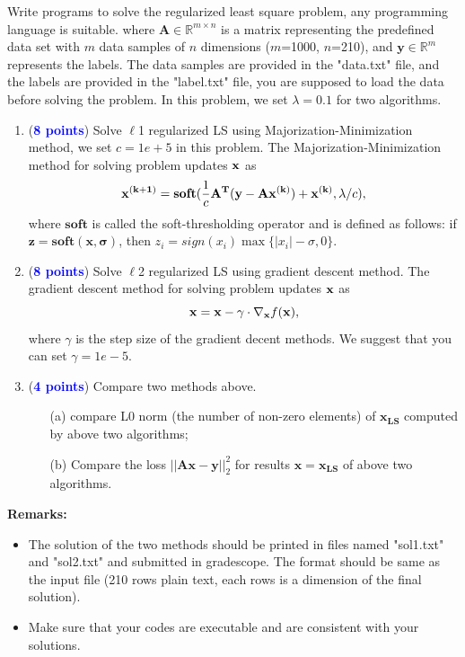 \documentclass[english,onecolumn]{IEEEtran}
\newcommand{\Rbb}{\mathbb{R}}
\begin{document}
Write programs to solve the regularized least square problem, any programming language is suitable. where $\mathbf{A} \in \Rbb^{m \times n}$ is a matrix representing the predefined data set with $m$ data samples of $n$ dimensions ($m$=1000, $n$=210), and $\mathbf{y} \in \Rbb^m$ represents the labels. The data samples are provided in the "data.txt" file, and the labels are provided in the "label.txt" file, you are supposed to load the data before solving the problem. In this problem, we set $\lambda=0.1$ for two algorithms.
\begin{enumerate}
    \item (\textcolor{blue}{\textbf{8 points}}) Solve $\ell$1 regularized LS using Majorization-Minimization method, we set $c=1e+5$ in this problem. The Majorization-Minimization method for solving problem updates $ {\bf x}$ as
    $$
        {\bf x^{(k+1)}} = \mathbf{soft}(\frac{1}{c}\mathbf{A^{T}}(\mathbf{y}-\mathbf{Ax^{(k)}})+\mathbf{x^{(k)}},\lambda/c),
    $$
 where $\mathbf{soft}$ is called the soft-thresholding operator and is defined as follows: if $\mathbf{z=soft(x,\sigma)}$, then $z_{i}=sign(x_{i})\max\{|x_{i}|-\sigma,0\}$.
    \item (\textcolor{blue}{\textbf{8 points}}) Solve $\ell$2 regularized LS using gradient descent method. The gradient descent method for solving problem updates $ {\bf x}$ as
    $$
        {\bf x} = {\bf x} - \gamma \cdot \nabla_{{\bf x}} f(\mathbf{x}),
    $$
 where $\gamma$ is the step size of the gradient decent methods. We suggest that you can set $\gamma=1e-5$. 
    \item (\textcolor{blue}{\textbf{4 points}}) Compare two methods above. 
    \begin{enumerate}
        \item[(a)] compare L0 norm (the number of non-zero elements) of $\mathbf{x_{LS}}$ computed by above two algorithms;
        \item[(b)] Compare the loss $||\mathbf{Ax-y}||^{2}_{2}$ for results $\mathbf{x}=\mathbf{x_{LS}}$ of above two algorithms.
    \end{enumerate}
\end{enumerate}

\noindent\textbf{Remarks: }
\begin{itemize}
    \item The solution of the two methods should be printed in files named "sol1.txt" and "sol2.txt" and submitted in gradescope.  The format should be same as the input file (210 rows plain text, each rows is a dimension of the final solution).
    \item Make sure that your codes are executable and are consistent with your solutions.
\end{itemize}
\end{document}
